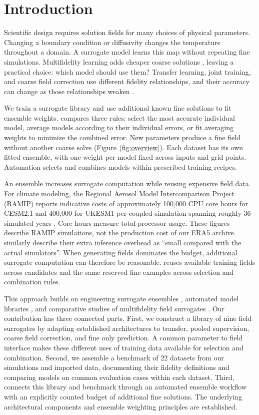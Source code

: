 \section{Introduction}
Scientific design requires solution fields for many choices of physical
parameters. Changing a boundary condition or diffusivity changes the temperature
throughout a domain. A surrogate model learns this map without repeating fine
simulations. Multifidelity learning adds cheaper coarse solutions
\citep{kennedy2000,howard2023,niu2024}, leaving a practical choice: which model
should use them? Transfer learning, joint training, and coarse field correction
use different fidelity relationships, and their accuracy can change as those
relationships weaken \citep{faza2026}.

We train a surrogate library and use additional known fine solutions to fit
ensemble weights. \method{} compares three
rules: select the most accurate individual model, average models according to
their individual errors, or fit averaging weights to minimize the combined
error. New parameters
produce a fine field without another coarse solve (Figure~\ref{fig:overview}).
Each dataset has its own fitted ensemble, with one weight per model fixed across
inputs and grid points. Automation selects and combines models within prescribed
training recipes.

An ensemble increases surrogate computation while reusing expensive field data.
For climate modeling, the Regional Aerosol Model Intercomparison Project
(RAMIP) reports indicative costs of approximately 100{,}000 CPU core hours for
CESM2.1 and 400{,}000 for UKESM1 per coupled simulation spanning roughly
36 simulated years \citep[Appendix~A]{wilcox2023ramip}. Core hours measure total
processor usage. These figures describe RAMIP simulations, not the production
cost of our ERA5 archive. \citet[Section~6]{niu2024} similarly describe their
extra inference overhead as ``small compared with the actual simulators''.
When generating fields dominates the budget, additional surrogate computation
can therefore be reasonable. \method{} reuses available training fields across
candidates and the same reserved fine examples across selection and combination
rules.

This approach builds on engineering surrogate ensembles
\citep{goel2007,acar2009,viana2009}, automated model libraries
\citep{feurer2015,erickson2020}, and comparative studies of multifidelity field
surrogates \citep{brunel2025}. Our contribution has three connected parts.
First, we construct a library of nine field surrogates by adapting established
architectures to transfer, pooled supervision, coarse field correction, and
fine only prediction. A common parameter to field interface makes these
different uses of training data available for selection and combination.
Second, we assemble a benchmark of 22 datasets from our simulations and imported
data, documenting their fidelity definitions and comparing models on common
evaluation cases within each dataset. Third, \method{} connects this library
and benchmark through an automated ensemble workflow with an explicitly counted
budget of additional fine solutions. The underlying architectural components
and ensemble weighting principles are established.


